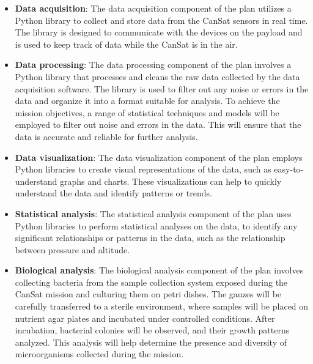 \begin{itemize}[leftmargin=1cm,itemindent=0.5cm, noitemsep, topsep=0pt]
\item \textbf{Data acquisition}: The data acquisition component of the plan utilizes a Python library to collect and store data from the CanSat sensors in real time. The library is designed to communicate with the devices on the payload and is used to keep track of data while the CanSat is in the air.
\item \textbf{Data processing}: The data processing component of the plan involves a Python library that processes and cleans the raw data collected by the data acquisition software. The library is used to filter out any noise or errors in the data and organize it into a format suitable for analysis. To achieve the mission objectives, a range of statistical techniques and models will be employed to filter out noise and errors in the data. This will ensure that the data is accurate and reliable for further analysis.
\item \textbf{Data visualization}: The data visualization component of the plan employs Python libraries to create visual representations of the data, such as easy-to-understand graphs and charts. These visualizations can help to quickly understand the data and identify patterns or trends.
\item \textbf{Statistical analysis}: The statistical analysis component of the plan uses Python libraries to perform statistical analyses on the data, to identify any significant relationships or patterns in the data, such as the relationship between pressure and altitude.
\item \textbf{Biological analysis}: The biological analysis component of the plan involves collecting bacteria from the sample collection system exposed during the CanSat mission and culturing them on petri dishes. The gauzes will be carefully transferred to a sterile environment, where samples will be placed on nutrient agar plates and incubated under controlled conditions. After incubation, bacterial colonies will be observed, and their growth patterns analyzed. This analysis will help determine the presence and diversity of microorganisms collected during the mission.
\end{itemize}





